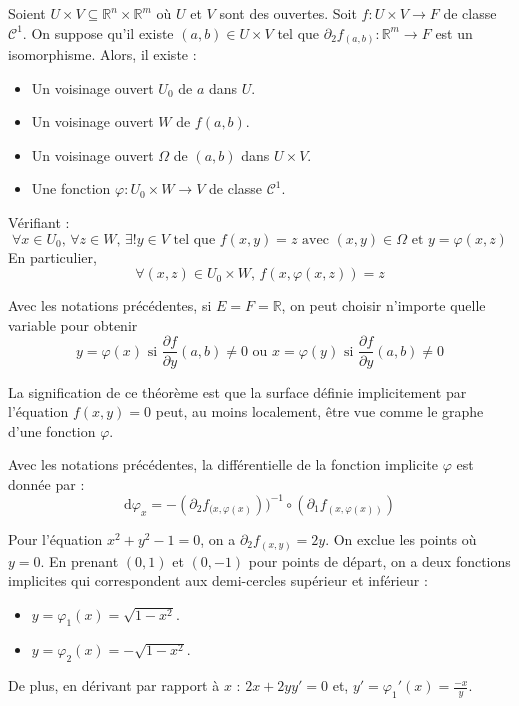   \begin{theorem}
    Soient $U \times V \subseteq \mathbb{R}^n \times \mathbb{R}^m$ où $U$ et $V$ sont des ouvertes. Soit $f : U \times V \rightarrow F$ de classe $\mathcal{C}^1$. On suppose qu'il existe $(a,b) \in U \times V$ tel que $\partial_2 f_{(a,b)} : \mathbb{R}^m \rightarrow F$ est un isomorphisme. Alors, il existe :
    \begin{itemize}
      \item Un voisinage ouvert $U_0$ de $a$ dans $U$.
      \item Un voisinage ouvert $W$ de $f(a,b)$.
      \item Un voisinage ouvert $\Omega$ de $(a,b)$ dans $U \times V$.
      \item Une fonction $\varphi : U_0 \times W \rightarrow V$ de classe $\mathcal{C}^1$.
    \end{itemize}
    Vérifiant :
    \[ \forall x \in U_0, \, \forall z \in W, \, \exists! y \in V \text{ tel que } f(x,y)=z \text{ avec } (x, y) \in \Omega \text{ et } y=\varphi(x,z) \]
    En particulier,
    \[ \forall (x,z) \in U_0 \times W, \, f(x, \varphi(x,z)) = z \]
  \end{theorem}


  \begin{remark}
    Avec les notations précédentes, si $E = F = \mathbb{R}$, on peut choisir n'importe quelle variable pour obtenir
    \[ y = \varphi(x) \text{ si } \frac{\partial f}{\partial y}(a,b) \neq 0 \text{ ou } x = \varphi(y) \text{ si } \frac{\partial f}{\partial y}(a,b) \neq 0 \]
  \end{remark}


  \begin{remark}
    La signification de ce théorème est que la surface définie implicitement par l'équation $f(x,y)=0$ peut, au moins localement, être vue comme le graphe d'une fonction $\varphi$.
  \end{remark}

  \begin{proposition}
    Avec les notations précédentes, la différentielle de la fonction implicite $\varphi$ est donnée par :
    \[ \mathrm{d}\varphi_x = -(\partial_2 f_{(x, \varphi(x)}))^{-1} \circ (\partial_1 f_{(x, \varphi(x))}) \]
  \end{proposition}

  \begin{example}
    Pour l'équation $x^2 + y^2 - 1 = 0$, on a $\partial_2 f_{(x,y)} = 2y$. On exclue les points où $y = 0$. En prenant $(0,1)$ et $(0,-1)$ pour points de départ, on a deux fonctions implicites qui correspondent aux demi-cercles supérieur et inférieur :
    \begin{itemize}
      \item $y = \varphi_1(x) = \sqrt{1-x^2}$.
      \item $y = \varphi_2(x) = -\sqrt{1-x^2}$.
    \end{itemize}
    De plus, en dérivant par rapport à $x$ : $2x + 2yy' = 0$ et, $y' = \varphi_1'(x) = \frac{-x}{y}$.
  \end{example}

